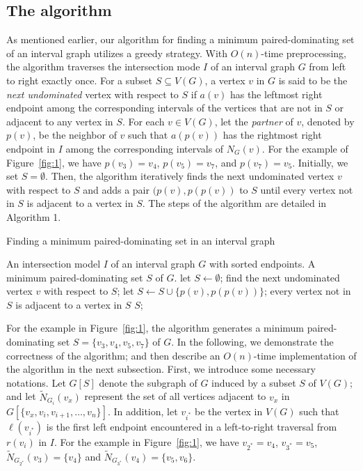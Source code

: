 \documentclass[12pt]{article}
\newcommand{\setof}[1]{\{{#1}\}}
\begin{document}
\subsection{The algorithm
                              \label{section:outline-algo-int}}
As mentioned earlier, our algorithm for finding a minimum
paired-dominating set of an interval graph utilizes a greedy
strategy. With $O(n)$-time preprocessing, the algorithm traverses
the intersection mode $I$ of an interval graph $G$ from left to
right exactly once. For a subset $S\subseteq V(G)$, a vertex $v$
in $G$ is said to be the {\em next undominated} vertex with
respect to $S$ if $a(v)$ has the leftmost right endpoint among the
corresponding intervals of the vertices that are not in $S$ or
adjacent to any vertex in $S$. For each $v \in V(G)$, let the {\em
partner} of $v$, denoted by $p(v)$, be the neighbor of $v$ such
that $a(p(v))$ has the rightmost right endpoint in $I$ among the
corresponding intervals of $N_G(v)$. For the example of
Figure~\ref{fig:1}, we have $p(v_3) = v_{4}$, $p(v_5) = v_{7}$,
and $p(v_7) = v_{5}$. Initially, we set $S=\emptyset$. Then, the
algorithm iteratively finds the next undominated vertex $v$ with
respect to $S$ and adds a pair $(p(v), p(p(v))$ to $S$ until every
vertex not in $S$ is adjacent to a vertex in $S$. The steps of the
algorithm are detailed in Algorithm 1.

\vspace{0.5pt}
\begin{algorithm}
\caption{Finding a minimum paired-dominating set in an interval
graph}
\begin{algorithmic} [1]
\REQUIRE An intersection model $I$ of an interval graph
$G$ with sorted endpoints.
\ENSURE A minimum paired-dominating set $S$ of
$G$.
\STATE let $S \leftarrow \emptyset$;
\REPEAT
\STATE find the next undominated vertex $v$ with
respect to $S$;
\STATE let $S \leftarrow S \cup \setof{p(v),p(p(v))}$;
\UNTIL every vertex not in $S$ is adjacent to a vertex
in $S$
\RETURN $S$;
\end{algorithmic}
\end{algorithm}

For the example in Figure~\ref{fig:1}, the algorithm generates a
minimum paired-dominating set $S = \{v_3,v_4,v_5,v_7\}$ of $G$. In
the following, we demonstrate the correctness of the algorithm;
and then describe an $O(n)$-time implementation of the algorithm
in the next subsection. First, we introduce some necessary
notations. Let $G[S]$ denote the subgraph of $G$ induced by a
subset $S$ of $V(G)$; and let $\tilde{N}_{G_{i}}(v_x)$ represent
the set of all vertices adjacent to $v_x$ in $G[\setof{v_x, v_i,
v_{i+1}, \ldots, v_n}]$. In addition, let $v_{i^*}$ be the vertex
in $V(G)$ such that $\ell(v_{i^*})$ is the first left endpoint
encountered in a left-to-right traversal from $r(v_i)$ in $I$. For
the example in Figure~\ref{fig:1}, we have $v_{2^*} = v_{4}$,
$v_{3^*} = v_{5}$, $\tilde{N}_{G_{2^*}}(v_3) = \setof{v_4}$ and
$\tilde{N}_{G_{3^*}}(v_4) = \setof{v_5,v_6}$.
\end{document}
